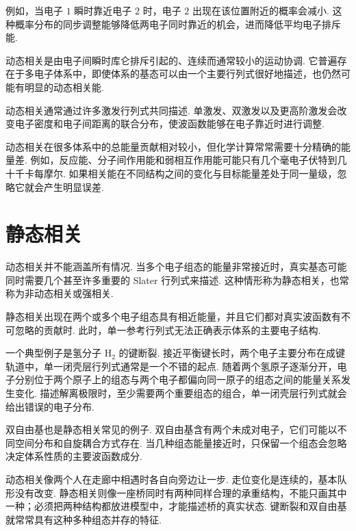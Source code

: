 \documentclass[UTF8,11pt,a4paper,openany]{ctexbook}
\begin{document}
例如，当电子 $1$ 瞬时靠近电子 $2$ 时，电子 $2$ 出现在该位置附近的概率会减小. 这种概率分布的同步调整能够降低两电子同时靠近的机会，进而降低平均电子排斥能. 

\begin{definitionbox}
动态相关是由电子间瞬时库仑排斥引起的、连续而通常较小的运动协调. 它普遍存在于多电子体系中，即使体系的基态可以由一个主要行列式很好地描述，也仍然可能有明显的动态相关能. 
\end{definitionbox}

动态相关通常通过许多激发行列式共同描述. 单激发、双激发以及更高阶激发会改变电子密度和电子间距离的联合分布，使波函数能够在电子靠近时进行调整. 

动态相关在很多体系中的总能量贡献相对较小，但化学计算常常需要十分精确的能量差. 例如，反应能、分子间作用能和弱相互作用能可能只有几个毫电子伏特到几十千卡每摩尔. 如果相关能在不同结构之间的变化与目标能量差处于同一量级，忽略它就会产生明显误差. 

\section{静态相关}

动态相关并不能涵盖所有情况. 当多个电子组态的能量非常接近时，真实基态可能同时需要几个甚至许多重要的 Slater 行列式来描述. 这种情形称为静态相关，也常称为非动态相关或强相关. 

\begin{definitionbox}
静态相关出现在两个或多个电子组态具有相近能量，并且它们都对真实波函数有不可忽略的贡献时. 此时，单一参考行列式无法正确表示体系的主要电子结构. 
\end{definitionbox}

一个典型例子是氢分子 $\mathrm{H}_2$ 的键断裂. 接近平衡键长时，两个电子主要分布在成键轨道中，单一闭壳层行列式通常是一个不错的起点. 随着两个氢原子逐渐分开，电子分别位于两个原子上的组态与两个电子都偏向同一原子的组态之间的能量关系发生变化. 描述解离极限时，至少需要两个重要组态的组合，单一闭壳层行列式就会给出错误的电子分布. 

双自由基也是静态相关常见的例子. 双自由基含有两个未成对电子，它们可能以不同空间分布和自旋耦合方式存在. 当几种组态能量接近时，只保留一个组态会忽略决定体系性质的主要波函数成分. 

\begin{analogybox}
动态相关像两个人在走廊中相遇时各自向旁边让一步. 走位变化是连续的，基本队形没有改变. 静态相关则像一座桥同时有两种同样合理的承重结构，不能只画其中一种；必须把两种结构都放进模型中，才能描述桥的真实状态. 键断裂和双自由基就常常具有这种多种组态并存的特征. 
\end{analogybox}
\end{document}

